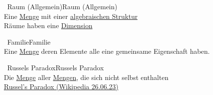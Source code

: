 		
		
		
		\begin{proposition}{\currentboxsection \ Raum (Allgemein)}{Raum (Allgemein)} \label{raum_allgemein}  \\
			Eine \hyperref[menge]{Menge} mit einer \hyperref[algebraische_struktur]{algebraischen Struktur} \\
			Räume haben eine \hyperref[dimension]{Dimension}
		\end{proposition}
			
		\begin{proposition}{\currentboxsection \ Familie}{Familie} \label{familie}  \\
			Eine \hyperref[menge]{Menge} deren Elemente alle eine gemeinsame Eigenschaft haben.
		\end{proposition}

	

	
		
		
		
				
		\begin{proposition}{\currentboxsection \ Russels Paradox}{Russels Paradox} \label{Russels_Paradox}  \\
			Die \hyperref[menge]{Menge} aller \hyperref[menge]{Mengen}, die sich nicht selbst enthalten \Lightning \\
			\href{https://en.wikipedia.org/wiki/Russell%27s_paradox}{Russel's Paradox (Wikipedia 26.06.23)}
		\end{proposition}
